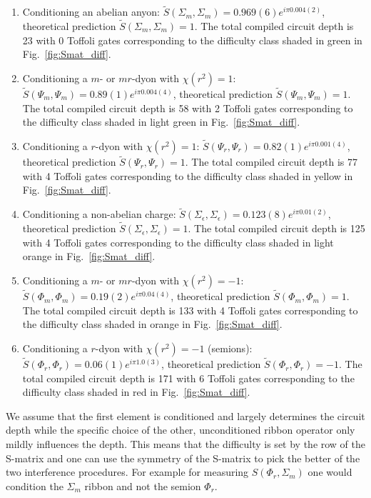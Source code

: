 \documentclass[a4paper,twocolumn,11pt, accepted=2024-06-14]{quantumarticle}
\begin{document}
\begin{enumerate}
	\item Conditioning an abelian anyon: $\tilde{S}(\Sigma_m, \Sigma_m) = 0.969(6)e^{i\pi 0.004(2)}$, theoretical prediction $\tilde{S}(\Sigma_m, \Sigma_m)=1$. The total compiled circuit depth is 23 with 0 Toffoli gates corresponding to the difficulty class shaded in green in Fig.~\ref{fig:Smat_diff}.
	\item Conditioning a $m$- or $mr$-dyon with $\chi(r^2) = 1$: $\tilde{S}(\Psi_m, \Psi_m) = 0.89(1)e^{i\pi 0.004(4)}$, theoretical prediction $\tilde{S}(\Psi_m, \Psi_m)=1$. The total compiled circuit depth is 58 with 2 Toffoli gates corresponding to the difficulty class shaded in light green in Fig.~\ref{fig:Smat_diff}.
	\item Conditioning a $r$-dyon with $\chi(r^2) = 1$: $\tilde{S}(\Psi_r, \Psi_r) = 0.82(1)e^{i\pi 0.001(4)}$, theoretical prediction $\tilde{S}(\Psi_r, \Psi_r)=1$. The total compiled circuit depth is 77 with 4 Toffoli gates corresponding to the difficulty class shaded in yellow in Fig.~\ref{fig:Smat_diff}.
	\item Conditioning a non-abelian charge: $\tilde{S}(\Sigma_\epsilon, \Sigma_\epsilon) = 0.123(8)e^{i\pi 0.01(2)}$, theoretical prediction $\tilde{S}(\Sigma_\epsilon, \Sigma_\epsilon)=1$. The total compiled circuit depth is 125 with 4 Toffoli gates corresponding to the difficulty class shaded in light orange in Fig.~\ref{fig:Smat_diff}.
	\item Conditioning a $m$- or $mr$-dyon with $\chi(r^2) = -1$: $\tilde{S}(\Phi_m, \Phi_m) = 0.19(2)e^{i\pi 0.04(4)}$, theoretical prediction $\tilde{S}(\Phi_m, \Phi_m)=1$. The total compiled circuit depth is 133 with 4 Toffoli gates corresponding to the difficulty class shaded in orange in Fig.~\ref{fig:Smat_diff}.
	\item Conditioning a $r$-dyon with $\chi(r^2) = -1$ (semions): $\tilde{S}(\Phi_r, \Phi_r) = 0.06(1)e^{i\pi 1.0(3)}$, theoretical prediction $\tilde{S}(\Phi_r, \Phi_r)=-1$. The total compiled circuit depth is 171 with 6 Toffoli gates corresponding to the difficulty class shaded in red in Fig.~\ref{fig:Smat_diff}.
\end{enumerate}
We assume that the first element is conditioned and largely determines the circuit depth while the specific choice of the other, unconditioned ribbon operator only mildly influences the depth. This means that the difficulty is set by the row of the S-matrix and one can use the symmetry of the S-matrix to pick the better of the two interference procedures. For example for measuring $S(\Phi_r, \Sigma_m)$ one would condition the $\Sigma_m$ ribbon and not the semion $\Phi_r$.
\end{document}
